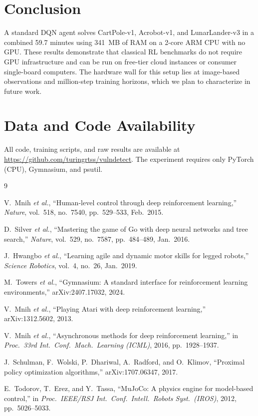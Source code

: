 \documentclass[11pt,a4paper]{article}
\begin{document}
\section{Conclusion}

A standard DQN agent solves CartPole-v1, Acrobot-v1, and LunarLander-v3 in a combined 59.7 minutes using 341~MB of RAM on a 2-core ARM CPU with no GPU. These results demonstrate that classical RL benchmarks do not require GPU infrastructure and can be run on free-tier cloud instances or consumer single-board computers. The hardware wall for this setup lies at image-based observations and million-step training horizons, which we plan to characterize in future work.

\section*{Data and Code Availability}

All code, training scripts, and raw results are available at \url{https://github.com/turingrtss/vulndetect}. The experiment requires only PyTorch (CPU), Gymnasium, and psutil.

\begin{thebibliography}{9}

V.~Mnih \textit{et al.}, ``Human-level control through deep reinforcement learning,'' \textit{Nature}, vol.~518, no.~7540, pp.~529--533, Feb.~2015.

D.~Silver \textit{et al.}, ``Mastering the game of Go with deep neural networks and tree search,'' \textit{Nature}, vol.~529, no.~7587, pp.~484--489, Jan.~2016.

J.~Hwangbo \textit{et al.}, ``Learning agile and dynamic motor skills for legged robots,'' \textit{Science Robotics}, vol.~4, no.~26, Jan.~2019.

M.~Towers \textit{et al.}, ``Gymnasium: A standard interface for reinforcement learning environments,'' arXiv:2407.17032, 2024.

V.~Mnih \textit{et al.}, ``Playing Atari with deep reinforcement learning,'' arXiv:1312.5602, 2013.

V.~Mnih \textit{et al.}, ``Asynchronous methods for deep reinforcement learning,'' in \textit{Proc.\ 33rd Int.\ Conf.\ Mach.\ Learning (ICML)}, 2016, pp.~1928--1937.

J.~Schulman, F.~Wolski, P.~Dhariwal, A.~Radford, and O.~Klimov, ``Proximal policy optimization algorithms,'' arXiv:1707.06347, 2017.

E.~Todorov, T.~Erez, and Y.~Tassa, ``MuJoCo: A physics engine for model-based control,'' in \textit{Proc.\ IEEE/RSJ Int.\ Conf.\ Intell.\ Robots Syst.\ (IROS)}, 2012, pp.~5026--5033.

\end{thebibliography}
\end{document}
